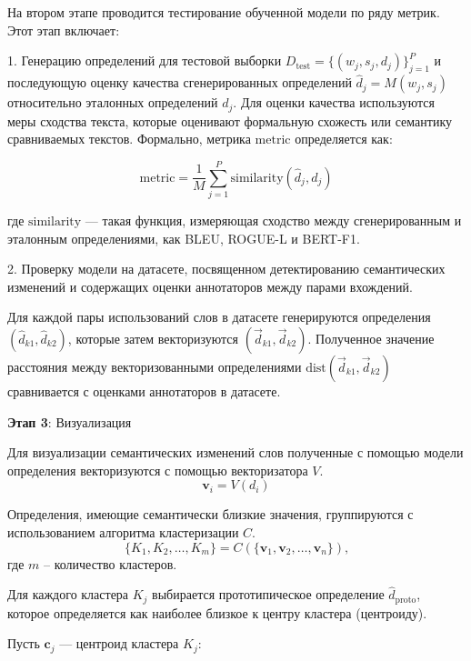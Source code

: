 \documentclass[LI,VKR]{HSEUniversity}
\begin{document}
На втором этапе проводится тестирование обученной модели по ряду метрик.
Этот этап включает:

1. Генерацию определений для тестовой выборки \( D_{\text{test}} = \{(w_j, s_j, d_j)\}_{j=1}^{P} \)
и последующую оценку качества сгенерированных определений \( \hat{d}_j = M(w_j, s_j) \) относительно
эталонных определений \( d_j \).
Для оценки качества используются меры сходства текста, которые оценивают формальную схожесть или семантику сравниваемых текстов.
Формально, метрика \( \text{metric} \) определяется как:

\begin{equation}
\text{metric} = \frac{1}{M} \sum_{j=1}^{P} \text{similarity}(\hat{d}_j, d_j)
\end{equation}

где \(\text{similarity}\) — такая функция, измеряющая сходство между сгенерированным и эталонным определениями,
как BLEU, ROGUE-L и BERT-F1.

2. Проверку модели на датасете, посвященном детектированию семантических изменений и
содержащих оценки аннотаторов между парами вхождений.

Для каждой пары использований слов в датасете генерируются определения \( (\hat{d}_{k1}, \hat{d}_{k2}) \),
которые затем векторизуются \( (\vec{d}_{k1}, \vec{d}_{k2}) \).
Полученное значение расстояния между векторизованными определениями \( \text{dist}(\vec{d}_{k1}, \vec{d}_{k2}) \)
сравнивается с оценками аннотаторов в датасете.

\textbf{Этап 3}: Визуализация

Для визуализации семантических изменений слов полученные с помощью модели определения векторизуются
с помощью векторизатора \( V \).
   \begin{equation}
   \mathbf{v}_i = V(d_i)
   \end{equation}

Определения, имеющие семантически близкие значения,
группируются с использованием алгоритма кластеризации \( C \).
   \begin{equation}
   \{K_1, K_2, \ldots, K_m\} = C(\{\mathbf{v}_1, \mathbf{v}_2, \ldots, \mathbf{v}_n\})\text{,}
   \end{equation}
   где \( m \) – количество кластеров.

Для каждого кластера \( K_j \) выбирается прототипическое определение \( \hat{d}_{\text{proto}} \),
которое определяется как наиболее близкое к центру кластера (центроиду).

Пусть \( \mathbf{c}_j \) — центроид кластера \( K_j \):
\end{document}
